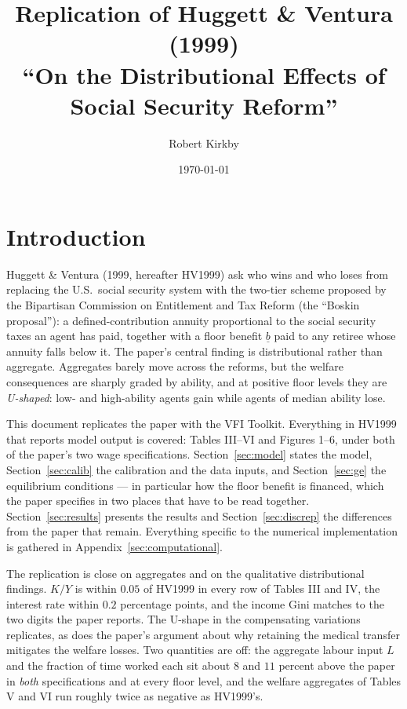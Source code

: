 \documentclass[11pt,fleqn]{article}
\begin{document}
\title{Replication of Huggett \& Ventura (1999)\\
\large ``On the Distributional Effects of Social Security Reform''}
\author{Robert Kirkby}
\date{\today}
\maketitle

\section{Introduction}\label{sec:intro}

Huggett \& Ventura (1999, hereafter HV1999) ask who wins and who loses from replacing the
U.S.\ social security system with the two-tier scheme proposed by the Bipartisan Commission
on Entitlement and Tax Reform (the ``Boskin proposal''): a defined-contribution annuity
proportional to the social security taxes an agent has paid, together with a floor benefit
$\underline{b}$ paid to any retiree whose annuity falls below it. The paper's central finding
is distributional rather than aggregate. Aggregates barely move across the reforms, but the
welfare consequences are sharply graded by ability, and at positive floor levels they are
\emph{U-shaped}: low- and high-ability agents gain while agents of median ability lose.

This document replicates the paper with the VFI Toolkit. Everything in HV1999 that reports
model output is covered: Tables III--VI and Figures 1--6, under both of the paper's two wage
specifications. Section~\ref{sec:model} states the model, Section~\ref{sec:calib} the
calibration and the data inputs, and Section~\ref{sec:ge} the equilibrium conditions --- in
particular how the floor benefit is financed, which the paper specifies in two places that
have to be read together. Section~\ref{sec:results} presents the results and
Section~\ref{sec:discrep} the differences from the paper that remain. Everything specific to
the numerical implementation is gathered in Appendix~\ref{sec:computational}.

The replication is close on aggregates and on the qualitative distributional findings. $K/Y$
is within $0.05$ of HV1999 in every row of Tables III and IV, the interest rate within
$0.2$ percentage points, and the income Gini matches to the two digits the paper reports. The
U-shape in the compensating variations replicates, as does the paper's argument about why
retaining the medical transfer mitigates the welfare losses. Two quantities are off: the
aggregate labour input $L$ and the fraction of time worked each sit about $8$ and $11$ percent
above the paper in \emph{both} specifications and at every floor level, and the welfare
aggregates of Tables V and VI run roughly twice as negative as HV1999's.
\end{document}
